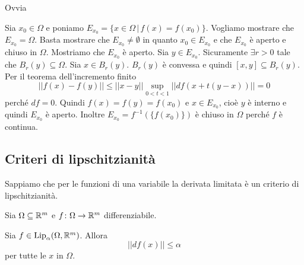 \documentclass[a4paper]{article}
\begin{document}
\begin{radioactive}
\begin{snippetproof}{}
    \begin{iffproof}
        \item Ovvia
        \item Sia \(x_0\in \Omega\) e poniamo \(E_{x_0} = \{x \in \Omega \,|\, f(x) = f(x_0) \}\).
        Vogliamo mostrare che \(E_{x_0} = \Omega\).
        Basta mostrare che \(E_{x_0} \neq \emptyset\) in quanto \(x_0 \in E_{x_0}\)
        e che \(E_{x_0}\) è aperto e chiuso in \(\Omega\).
        Mostriamo che \(E_{x_0}\) è aperto. Sia \(y \in E_{x_0}\). Sicuramente
        \(\exists r > 0\) tale che \(B_r(y) \subseteq \Omega\).
        Sia \(x \in B_r(y)\). \(B_r(y)\) è convessa e quindi
        \([x,y] \subseteq B_r(y)\). Per il teorema dell'incremento finito 
        \[
            ||f(x) - f(y)|| \leq ||x-y|| \sup_{0 < t <1} ||df(x + t(y-x))|| = 0
        \]
        perché \(df = 0\).
        Quindi \(f(x)=f(y) = f(x_0)\) e \(x \in E_{x_0}\), cioè \(y\) è interno
        e quindi \(E_{x_0}\) è aperto. Inoltre \(E_{x_0}=f^{-1}(\{f(x_0)\})\)
        è chiuso in \(\Omega\) perché \(f\) è continua.
    \end{iffproof}
\end{snippetproof}
\end{radioactive}

\subsection{Criteri di lipschitzianità}

\begin{radioactive}
Sappiamo che per le funzioni di una variabile la derivata limitata è un criterio di
lipschitzianità.

Sia \(\Omega \subseteq \mathbb{R}^m\) e \(f \colon \Omega \to \mathbb{R}^m\)
differenziabile.

\begin{snippetproposition}{}
    Sia \(f \in \text{Lip}_\alpha(\Omega, \mathbb{R}^m)\).
    Allora \[
        ||df(x)|| \leq \alpha
    \]
    per tutte le \(x\) in \(\Omega\).
\end{snippetproposition}
\end{radioactive}
\end{document}
